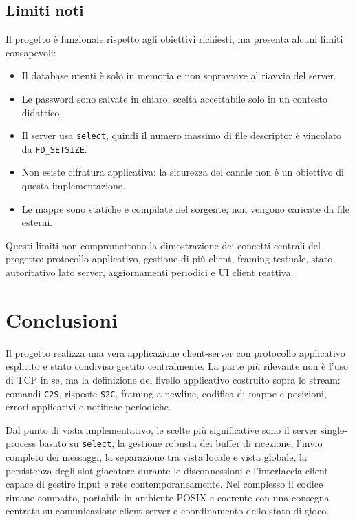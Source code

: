 \documentclass[11pt,a4paper]{article}
\begin{document}
\subsection{Limiti noti}

Il progetto è funzionale rispetto agli obiettivi richiesti, ma presenta alcuni limiti consapevoli:

\begin{itemize}
  \item Il database utenti è solo in memoria e non sopravvive al riavvio del server.
  \item Le password sono salvate in chiaro, scelta accettabile solo in un contesto didattico.
  \item Il server usa \texttt{select}, quindi il numero massimo di file descriptor è vincolato da \texttt{FD\_SETSIZE}.
  \item Non esiste cifratura applicativa: la sicurezza del canale non è un obiettivo di questa implementazione.
  \item Le mappe sono statiche e compilate nel sorgente; non vengono caricate da file esterni.
\end{itemize}

Questi limiti non compromettono la dimostrazione dei concetti centrali del progetto: protocollo applicativo, gestione di più client, framing testuale, stato autoritativo lato server, aggiornamenti periodici e UI client reattiva.

\section{Conclusioni}

Il progetto realizza una vera applicazione client-server con protocollo applicativo esplicito e stato condiviso gestito centralmente. La parte più rilevante non è l'uso di TCP in se, ma la definizione del livello applicativo costruito sopra lo stream: comandi \texttt{C2S}, risposte \texttt{S2C}, framing a newline, codifica di mappe e posizioni, errori applicativi e notifiche periodiche.

Dal punto di vista implementativo, le scelte più significative sono il server single-process basato su \texttt{select}, la gestione robusta dei buffer di ricezione, l'invio completo dei messaggi, la separazione tra vista locale e vista globale, la persistenza degli slot giocatore durante le disconnessioni e l'interfaccia client capace di gestire input e rete contemporaneamente. Nel complesso il codice rimane compatto, portabile in ambiente POSIX e coerente con una consegna centrata su comunicazione client-server e coordinamento dello stato di gioco.
\end{document}
